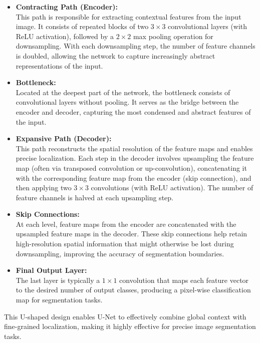 \begin{itemize}
  \item \textbf{Contracting Path (Encoder):} \\
        This path is responsible for extracting contextual features from the input image. It consists of repeated blocks of two $3\times3$ convolutional layers (with ReLU activation), followed by a $2\times2$ max pooling operation for downsampling. With each downsampling step, the number of feature channels is doubled, allowing the network to capture increasingly abstract representations of the input.

  \item \textbf{Bottleneck:} \\
        Located at the deepest part of the network, the bottleneck consists of convolutional layers without pooling. It serves as the bridge between the encoder and decoder, capturing the most condensed and abstract features of the input.

  \item \textbf{Expansive Path (Decoder):} \\
        This path reconstructs the spatial resolution of the feature maps and enables precise localization. Each step in the decoder involves upsampling the feature map (often via transposed convolution or up-convolution), concatenating it with the corresponding feature map from the encoder (skip connection), and then applying two $3\times3$ convolutions (with ReLU activation). The number of feature channels is halved at each upsampling step.

  \item \textbf{Skip Connections:} \\
        At each level, feature maps from the encoder are concatenated with the upsampled feature maps in the decoder. These skip connections help retain high-resolution spatial information that might otherwise be lost during downsampling, improving the accuracy of segmentation boundaries.

  \item \textbf{Final Output Layer:} \\
        The last layer is typically a $1\times1$ convolution that maps each feature vector to the desired number of output classes, producing a pixel-wise classification map for segmentation tasks.
\end{itemize}

This U-shaped design enables U-Net to effectively combine global context with fine-grained localization, making it highly effective for precise image segmentation tasks.

